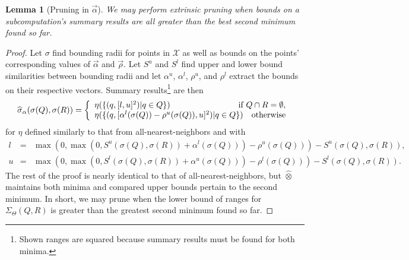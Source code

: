 \documentclass{article}
\newtheorem{lemma}{Lemma}
\newcommand{\killspace}{\vspace{-0.08in}}
\newcommand{\GNP}[1][\psi]{{#1}_{\Theta}}
\newcommand{\sigmahat}{\mathbin{\widehat{\sigma}}}
\newcommand{\otimeshat}{\mathbin{\widehat{\otimes}}}
\newcommand{\simhrectmin}{S^{l}}
\newcommand{\simhrectmax}{S^{u}}
\newcommand{\vecrho}{\vec{\rho}}
\newcommand{\vecalpha}{\vec{\alpha}}
\newcommand{\falphamax}{\alpha^{u}}
\newcommand{\falphamin}{\alpha^{l}}
\newcommand{\frhomax}{\rho^{u}}
\newcommand{\frhomin}{\rho^{l}}
\begin{document}
\begin{lemma}[Pruning in $\vecalpha$]
  We may perform extrinsic pruning when bounds on a subcomputation's summary results are all greater than the best second minimum found so far.
\end{lemma}
\killspace
\begin{proof}
  Let $\sigma$ find bounding radii for points in $\mathcal{X}$ as well as bounds on the points' corresponding values of $\vecalpha$ and $\vecrho$.
  Let $\simhrectmax$ and $\simhrectmin$ find upper and lower bound similarities
  between bounding radii and let $\falphamax$, $\falphamin$, $\frhomax$, and
  $\frhomin$ extract the bounds on their respective vectors.
  Summary results\footnote{Shown ranges are squared because summary results must be found for both minima.} are then
  \[
  \sigmahat_{\alpha}(\sigma(Q),\sigma(R)) = \left\{ \begin{array}{lrr}
    \eta(\{(q,[l, u]^2) | q \in Q\}) & \multicolumn{2}{r}{\mbox{if } Q \cap R = \emptyset,} \\
    \multicolumn{2}{l}{\eta(\{(q,[\falphamin(\sigma(Q)) - \frhomax(\sigma(Q)), u]^2) | q \in Q\})} & \mbox{otherwise}
  \end{array} \right. \\
  \]
  for $\eta$ defined similarly to that from all-nearest-neighbors and
  with
  \begin{eqnarray*}
    l & = & \max(0,\max(0,\simhrectmax(\sigma(Q),\sigma(R)) + \falphamin(\sigma(Q))) - \frhomax(\sigma(Q))) - \simhrectmax(\sigma(Q),\sigma(R)), \\
    u & = & \max(0,\max(0,\simhrectmin(\sigma(Q),\sigma(R)) + \falphamax(\sigma(Q))) - \frhomin(\sigma(Q))) - \simhrectmin(\sigma(Q),\sigma(R)).
  \end{eqnarray*}
  The rest of the proof is nearly identical to that of
  all-nearest-neighbors, but $\otimeshat$ maintains both minima and
  compared upper bounds pertain to the second minimum.  In short, we
  may prune when the lower bound of ranges for $\GNP[\Sigma](Q,R)$ is
  greater than the greatest second minimum found so far.
\end{proof}
\end{document}
